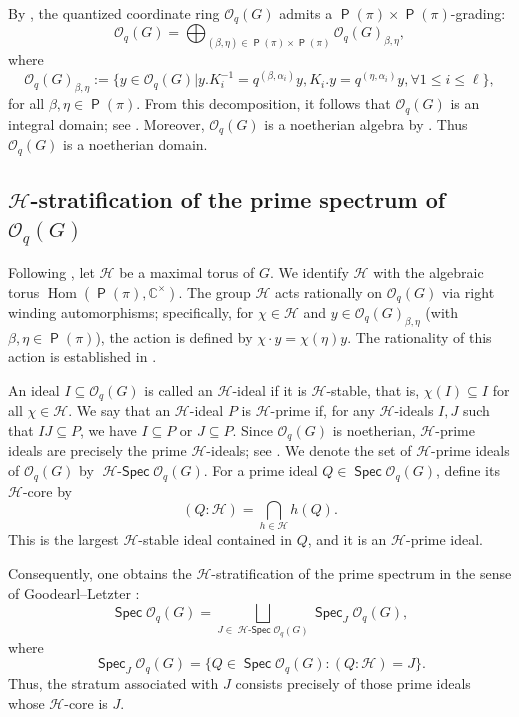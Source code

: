 \documentclass[11pt]{article}
\theoremstyle{definition}
\numberwithin{equation}{section}
\newcommand{\CC}{\mathbb{C}}
\newcommand{\qu}{\mathcal{O}}
\newcommand{\Hf}{\mathcal{H}} %
\DeclareMathOperator{\Hom}{\mathrm{Hom}}
\DeclareMathOperator{\pois}{\mathsf{P}}
\DeclareMathOperator{\spec}{\mathsf{Spec}}
\DeclareMathOperator{\hspec}{\Hf-\mathsf{Spec}}
\begin{document}
  By  \cite[Lemma I.8.7]{BG02}, the quantized coordinate ring $\qu_q(G)$ admits a $\pois(\pi)\times\pois(\pi)$-grading:
\begin{equation}\label{decompqug}
	\qu_q(G)= \displaystyle\bigoplus_{(\beta,\eta)\in\pois(\pi)\times \pois(\pi)}\qu_q(G)_{\beta,\eta}, 
\end{equation} 
where
\begin{equation}\label{weigspaqug}
	\qu_q(G)_{\beta,\eta}:= \{y\in\qu_q(G)| y.K_i^{-1}= q^{(\beta,\alpha_i)}y, K_i.y= q^{(\eta,\alpha_i)}y, \forall 1\le i\le\ell\},
\end{equation}
for all $\beta,\eta\in\pois(\pi)$. From this decomposition, it follows that $\qu_q(G)$ is an integral domain; see \cite[Theorem I.8.9]{BG02}. Moreover,  $\qu_q(G)$ is a noetherian algebra by \cite[Theorem I.8.18]{BG02}. Thus $\qu_q(G)$ is a noetherian domain. 

\subsection{$\Hf$-stratification of the prime spectrum of $\qu_q(G)$}
Following \cite[I.7.1, II.1.18]{BG02}, let $\Hf$ be a maximal torus of $G$. We identify $\Hf$ with the algebraic torus $\Hom(\pois(\pi), \CC^{\times})$. The group $\Hf$ acts rationally on $\qu_q(G)$ via right winding automorphisms; specifically, for $\chi \in \Hf$ and $y \in \qu_q(G)_{\beta, \eta}$ (with $\beta, \eta \in \pois(\pi)$), the action is defined by $\chi \cdot y = \chi(\eta)y$. The rationality of this action is established in \cite[Exercise II.2.G]{BG02}.

An ideal $I \subseteq \qu_q(G)$ is called an $\Hf$-ideal if it is $\Hf$-stable, that is, $\chi(I) \subseteq I$ for all $\chi \in \Hf$. We say that an $\Hf$-ideal $P$ is $\Hf$-prime if, for any $\Hf$-ideals $I, J$ such that $IJ \subseteq P$, we have $I \subseteq P$ or $J \subseteq P$. Since $\qu_q(G)$ is noetherian, $\Hf$-prime ideals are precisely the prime $\Hf$-ideals; see \cite[Corollary II.1.12]{BG02}. We denote the set of $\Hf$-prime ideals of $\qu_q(G)$ by $\hspec\qu_q(G)$.  For a prime ideal $Q \in\spec\qu_q(G)$, define its $\Hf$-core by $$(Q : \Hf) = \bigcap_{h \in \Hf} h(Q).$$ 
This is the largest $\Hf$-stable ideal contained in $Q$, and it is an $\Hf$-prime ideal.

Consequently, one obtains the $\Hf$-stratification of the prime spectrum in the sense of Goodearl--Letzter \cite[2.1]{GL00}:
\begin{equation}\label{glhstrata}
	\spec\qu_q(G) = \bigsqcup_{J \in\hspec \qu_q(G)} \spec_J\qu_q(G),
\end{equation}
where  $$
\spec_J\qu_q(G)= \{Q\in\spec\qu_q(G): (Q: \Hf)= J\}.$$
Thus, the stratum associated with $J$ consists precisely of those prime ideals whose $\Hf$-core is  $J$.
\end{document}
